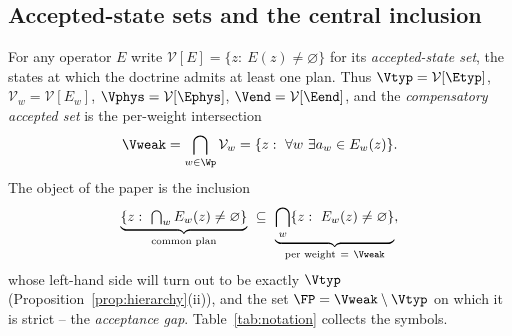 \subsection{Accepted-state sets and the central inclusion}

For any operator $E$ write $\mathcal V[E]=\{z:\ E(z)\ne\varnothing\}$ for its \emph{accepted-state set}, the states at which the doctrine admits at least one plan. Thus $\Vtyp=\mathcal V[\Etyp]$, $\mathcal V_w=\mathcal V[E_w]$, $\Vphys=\mathcal V[\Ephys]$, $\Vend=\mathcal V[\Eend]$, and the \emph{compensatory accepted set} is the per-weight intersection
\begin{equation}
\Vweak=\bigcap_{w\in\Wp}\mathcal V_w=\{z:\ \forall w\ \exists a_w\in E_w(z)\}.
\label{eq:Vweak}
\end{equation}
The object of the paper is the inclusion
\begin{equation}
\underbrace{\{z:\ \textstyle\bigcap_w E_w(z)\neq\varnothing\}}_{\text{common plan}}\ \subseteq\ \underbrace{\bigcap_w\{z:\ E_w(z)\neq\varnothing\}}_{\text{per weight}\ =\ \Vweak},
\label{eq:central}
\end{equation}
whose left-hand side will turn out to be exactly $\Vtyp$ (Proposition~\ref{prop:hierarchy}(ii)), and the set $\FP=\Vweak\setminus\Vtyp$ on which it is strict -- the \emph{acceptance gap}. Table~\ref{tab:notation} collects the symbols.

